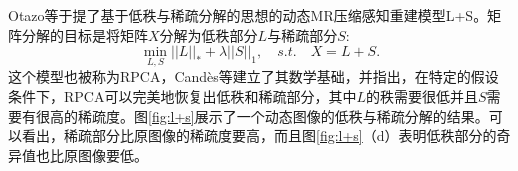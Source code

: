 Otazo等于提了基于低秩与稀疏分解的思想的动态MR压缩感知重建模型L+S\cite{lpluss}。矩阵分解的目标是将矩阵$X$分解为低秩部分$L$与稀疏部分$S$:
\begin{equation}
	\min_{L,S}||L||_*+\lambda||S||_1, \quad s.t. \quad X=L+S.
\end{equation}
这个模型也被称为RPCA，Candès等\cite{rpca}建立了其数学基础，并指出，在特定的假设条件下，RPCA可以完美地恢复出低秩和稀疏部分，其中$L$的秩需要很低并且$S$需要有很高的稀疏度。图\ref{fig:l+s}展示了一个动态图像的低秩与稀疏分解的结果。可以看出，稀疏部分比原图像的稀疏度要高，而且图\ref{fig:l+s}（d）表明低秩部分的奇异值也比原图像要低。
\begin{figure}[htbp]
\centering
{}


\end{figure}
